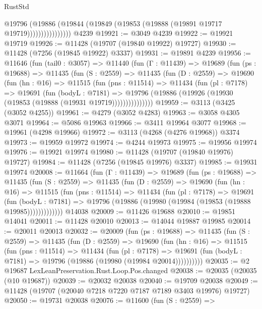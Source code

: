 \begin{lexlean}{RustStd}
\begin{coremodule}
                      @19796
                        (@19886
                          (@19844 (@19849 (@19853 (@19888 (@19891 @19717 @19719))))))))))))))))
    @4239
@19921 := @3049 @4239
@19922 := @19921 @19719
@19926 := @11428 (@19707 (@19840 @19922) @19727)
@19930 := @11428 (@7256 (@19845 @19922) @3337)
@19931 := @19891 @4239
@19956 := @11646
    (fun (tail0 : @3057) =>
    @11440
      (fun (Γ : @11439) =>
      @19689
        (fun (ps : @19688) =>
        @11435
          (fun (S : @2559) =>
          @11435
            (fun (D : @2559) =>
            @19690
              (fun (hn : @16) =>
              @11515
                (fun (pns : @11514) =>
                @11434
                  (fun (pl : @7178) =>
                  @19691
                    (fun (bodyL : @7181) =>
                    @19796 (@19886 (@19926 (@19930 (@19853 (@19888 (@19931 @19719)))))))))))))))
@19959 := @3113 (@3425 (@3052 @4255))
@19961 := @4279 (@3052 @4283)
@19963 := @3058 @4305 @3071
@19964 := @5086 @19963
@19966 := @3411 @19964 @3077
@19968 := @19961 (@4298 @19966)
@19972 := @3113 (@4268 (@4276 @19968)) @3374
@19973 := @19959 @19972
@19974 := @4244 @19973
@19975 := @19956 @19974
@19976 := @19921 @19974
@19980 := @11428 (@19707 (@19840 @19976) @19727)
@19984 := @11428 (@7256 (@19845 @19976) @3337)
@19985 := @19931 @19974
@20008 := @11664
    (fun (Γ : @11439) =>
    @19689
      (fun (ps : @19688) =>
      @11435
        (fun (S : @2559) =>
        @11435
          (fun (D : @2559) =>
          @19690
            (fun (hn : @16) =>
            @11515
              (fun (pns : @11514) =>
              @11434
                (fun (pl : @7178) =>
                @19691
                  (fun (bodyL : @7181) =>
                  @19796 (@19886 (@19980 (@19984 (@19853 (@19888 @19985)))))))))))))
    @14038
@20009 := @11426 @19688
@20010 := @19851 @14041
@20011 := @11428 @20010
@20013 := @14044 @19887 @19985
@20014 := @20011 @20013
@20032 := @20009
    (fun (ps : @19688) =>
    @11435
      (fun (S : @2559) =>
      @11435
        (fun (D : @2559) =>
        @19690
          (fun (hn : @16) =>
          @11515
            (fun (pns : @11514) =>
            @11434
              (fun (pl : @7178) =>
              @19691 (fun (bodyL : @7181) => @19796 (@19886 (@19980 (@19984 @20014))))))))))
@20035 := @2 @19687 LexLeanPreservation.Rust.Loop.Pos.changed
@20038 := @20035 (@20035 (@10 @19687))
@20039 := @20032 @20038
@20040 := @19709 @20038
@20049 := @11428 (@19707 (@20040 @7218 @7220 @7187 @7189 @3403 @19976) @19727)
@20050 := @19731 @20038
@20076 := @11600
    (fun (S : @2559) =>

\end{coremodule}
\end{lexlean}

